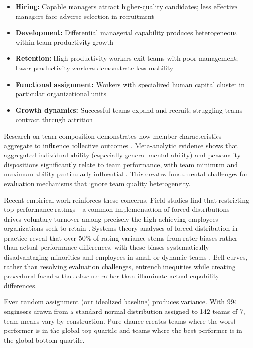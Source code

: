 \documentclass[12pt]{article}
\begin{document}
\begin{itemize}
\item \textbf{Hiring:} Capable managers attract higher-quality candidates; less effective managers face adverse selection in recruitment
\item \textbf{Development:} Differential managerial capability produces heterogeneous within-team productivity growth
\item \textbf{Retention:} High-productivity workers exit teams with poor management; lower-productivity workers demonstrate less mobility
\item \textbf{Functional assignment:} Workers with specialized human capital cluster in particular organizational units
\item \textbf{Growth dynamics:} Successful teams expand and recruit; struggling teams contract through attrition
\end{itemize}

Research on team composition demonstrates how member characteristics aggregate to influence collective outcomes \citep{stewart2006meta, bell2007deep}. Meta-analytic evidence shows that aggregated individual ability (especially general mental ability) and personality dispositions significantly relate to team performance, with team minimum and maximum ability particularly influential \citep{bell2007deep}. This creates fundamental challenges for evaluation mechanisms that ignore team quality heterogeneity.

Recent empirical work reinforces these concerns. Field studies find that restricting top performance ratings---a common implementation of forced distributions---drives voluntary turnover among precisely the high-achieving employees organizations seek to retain \citep{cornell2025rankings}. Systems-theory analyses of forced distribution in practice reveal that over 50\% of rating variance stems from rater biases rather than actual performance differences, with these biases systematically disadvantaging minorities and employees in small or dynamic teams \citep{hrdm2025systems}. Bell curves, rather than resolving evaluation challenges, entrench inequities while creating procedural facades that obscure rather than illuminate actual capability differences.


Even random assignment (our idealized baseline) produces variance. With 994 engineers drawn from a standard normal distribution assigned to 142 teams of 7, team means vary by construction. Pure chance creates teams where the worst performer is in the global top quartile and teams where the best performer is in the global bottom quartile.
\end{document}
